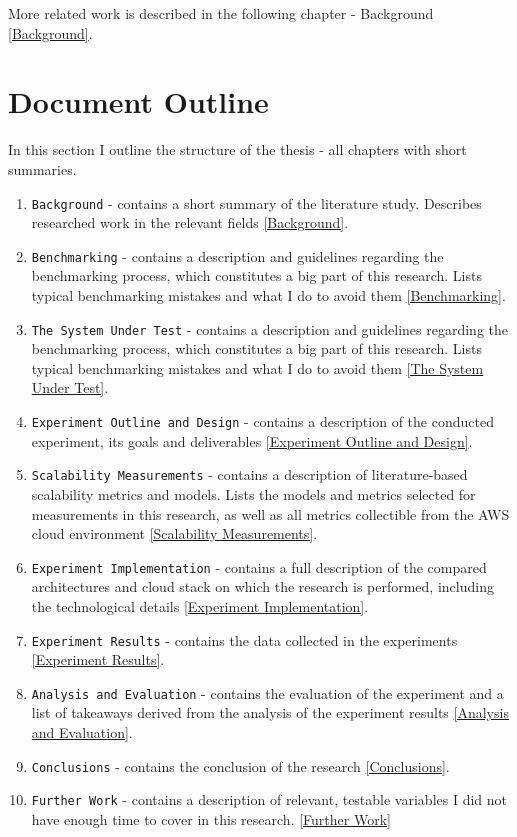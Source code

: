 \documentclass{uvamscse}
\begin{document}
More related work is described in the following chapter - Background \ref{Background}.

\section{Document Outline}
In this section I outline the structure of the thesis - all chapters with short summaries.

\begin{enumerate}
  \item \texttt{Background} - contains a short summary of the literature study. Describes researched work in the relevant fields \ref{Background}.
  \item \texttt{Benchmarking} - contains a description and guidelines regarding the benchmarking process, which constitutes a big part of this research. Lists typical benchmarking mistakes and what I do to avoid them \ref{Benchmarking}.
  \item \texttt{The System Under Test} - contains a description and guidelines regarding the benchmarking process, which constitutes a big part of this research. Lists typical benchmarking mistakes and what I do to avoid them \ref{The System Under Test}.
  \item \texttt{Experiment Outline and Design} - contains a description of the conducted experiment, its goals and deliverables \ref{Experiment Outline and Design}.
  \item \texttt{Scalability Measurements} - contains a description of literature-based scalability metrics and models. Lists the models and metrics selected for measurements in this research, as well as all metrics collectible from the AWS cloud environment \ref{Scalability Measurements}.
  \item \texttt{Experiment Implementation} - contains a full description of the compared architectures and cloud stack on which the research is performed, including the technological details \ref{Experiment Implementation}.
  \item \texttt{Experiment Results} - contains the data collected in the experiments \ref{Experiment Results}.
  \item \texttt{Analysis and Evaluation} - contains the evaluation of the experiment and a list of takeaways derived from the analysis of the experiment results \ref{Analysis and Evaluation}.
  \item \texttt{Conclusions} - contains the conclusion of the research \ref{Conclusions}.
  \item \texttt{Further Work} - contains a description of relevant, testable variables I did not have enough time to cover in this research. \ref{Further Work}
\end{enumerate}
\end{document}
